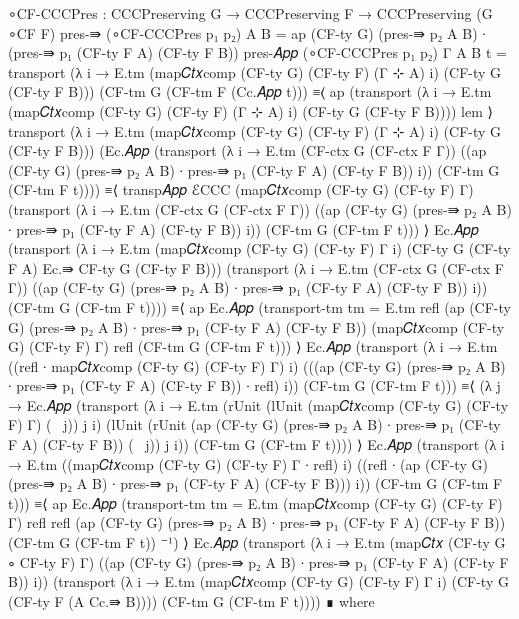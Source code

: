 \begin{code}[hide]
  ∘CF-CCCPres : CCCPreserving G → CCCPreserving F → CCCPreserving (G ∘CF F)
  pres-⇛ (∘CF-CCCPres p₁ p₂) A B =
    ap (CF-ty G) (pres-⇛ p₂ A B) ∙ (pres-⇛ p₁ (CF-ty F A) (CF-ty F B))
  pres-𝐴𝑝𝑝 (∘CF-CCCPres p₁ p₂) {Γ} {A} {B} t =
    transport (λ i → E.tm (map𝐶𝑡𝑥comp (CF-ty G) (CF-ty F) (Γ ⊹ A) i) (CF-ty G (CF-ty F B)))
      (CF-tm G (CF-tm F (Cc.𝐴𝑝𝑝 t)))
      ≡⟨ ap (transport (λ i → E.tm (map𝐶𝑡𝑥comp (CF-ty G) (CF-ty F) (Γ ⊹ A) i)
        (CF-ty G (CF-ty F B)))) lem ⟩
    transport (λ i → E.tm (map𝐶𝑡𝑥comp (CF-ty G) (CF-ty F) (Γ ⊹ A) i) (CF-ty G (CF-ty F B)))
      (Ec.𝐴𝑝𝑝 (transport (λ i → E.tm (CF-ctx G (CF-ctx F Γ)) ((ap (CF-ty G) (pres-⇛ p₂ A B)
        ∙ pres-⇛ p₁ (CF-ty F A) (CF-ty F B)) i)) (CF-tm G (CF-tm F t))))
      ≡⟨ transp𝐴𝑝𝑝 ℰCCC (map𝐶𝑡𝑥comp (CF-ty G) (CF-ty F) Γ) (transport (λ i → E.tm
        (CF-ctx G (CF-ctx F Γ)) ((ap (CF-ty G) (pres-⇛ p₂ A B)
        ∙ pres-⇛ p₁ (CF-ty F A) (CF-ty F B)) i)) (CF-tm G (CF-tm F t))) ⟩
    Ec.𝐴𝑝𝑝 (transport
      (λ i → E.tm (map𝐶𝑡𝑥comp (CF-ty G) (CF-ty F) Γ i)
        (CF-ty G (CF-ty F A) Ec.⇛ CF-ty G (CF-ty F B)))
      (transport
        (λ i → E.tm (CF-ctx G (CF-ctx F Γ)) ((ap (CF-ty G) (pres-⇛ p₂ A B)
          ∙ pres-⇛ p₁ (CF-ty F A) (CF-ty F B)) i))
        (CF-tm G (CF-tm F t))))
      ≡⟨ ap Ec.𝐴𝑝𝑝 (transport-tm {tm = E.tm} refl (ap (CF-ty G) (pres-⇛ p₂ A B)
        ∙ pres-⇛ p₁ (CF-ty F A) (CF-ty F B)) (map𝐶𝑡𝑥comp (CF-ty G) (CF-ty F) Γ) refl
        (CF-tm G (CF-tm F t))) ⟩
    Ec.𝐴𝑝𝑝 (transport (λ i → E.tm
      ((refl ∙ map𝐶𝑡𝑥comp (CF-ty G) (CF-ty F) Γ) i)
      (((ap (CF-ty G) (pres-⇛ p₂ A B) ∙ pres-⇛ p₁ (CF-ty F A) (CF-ty F B)) ∙ refl) i))
      (CF-tm G (CF-tm F t)))
      ≡⟨ (λ j → Ec.𝐴𝑝𝑝 (transport (λ i → E.tm
        (rUnit (lUnit (map𝐶𝑡𝑥comp (CF-ty G) (CF-ty F) Γ) (~ j)) j i)
        (lUnit (rUnit (ap (CF-ty G) (pres-⇛ p₂ A B)
          ∙ pres-⇛ p₁ (CF-ty F A) (CF-ty F B)) (~ j)) j i))
        (CF-tm G (CF-tm F t)))) ⟩
    Ec.𝐴𝑝𝑝 (transport (λ i → E.tm
      ((map𝐶𝑡𝑥comp (CF-ty G) (CF-ty F) Γ ∙ refl) i)
      ((refl ∙ (ap (CF-ty G) (pres-⇛ p₂ A B) ∙ pres-⇛ p₁ (CF-ty F A) (CF-ty F B))) i))
      (CF-tm G (CF-tm F t)))
      ≡⟨ ap Ec.𝐴𝑝𝑝 (transport-tm {tm = E.tm} (map𝐶𝑡𝑥comp (CF-ty G) (CF-ty F) Γ) refl
        refl (ap (CF-ty G) (pres-⇛ p₂ A B) ∙ pres-⇛ p₁ (CF-ty F A) (CF-ty F B))
        (CF-tm G (CF-tm F t)) ⁻¹) ⟩
    Ec.𝐴𝑝𝑝 (transport (λ i → E.tm (map𝐶𝑡𝑥 (CF-ty G ∘ CF-ty F) Γ)
      ((ap (CF-ty G) (pres-⇛ p₂ A B) ∙ pres-⇛ p₁ (CF-ty F A) (CF-ty F B)) i))
      (transport (λ i → E.tm (map𝐶𝑡𝑥comp (CF-ty G) (CF-ty F) Γ i) (CF-ty G (CF-ty F (A Cc.⇛ B))))
        (CF-tm G (CF-tm F t))))
      ∎ where

\end{code}
